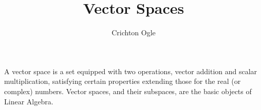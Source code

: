 \documentclass{ximera}
\title{Vector Spaces}
\author{Crichton Ogle}
\begin{document}
\begin{abstract}
\end{abstract}
\maketitle

A vector space is a set equipped with two operations, vector addition
and scalar multiplication, satisfying certain properties extending those for the real (or complex) numbers. Vector spaces, and their subspaces, are the basic objects of Linear Algebra.
\end{document}
